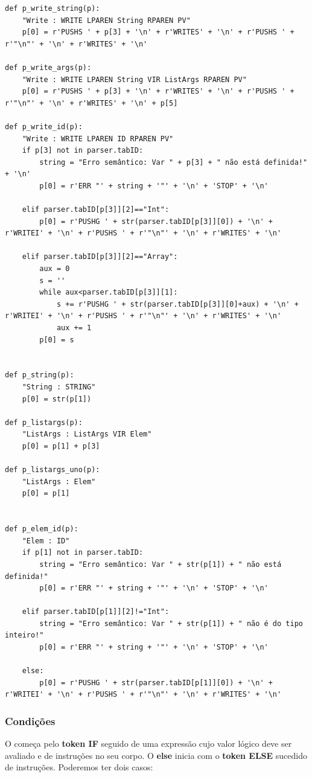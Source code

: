 \documentclass{article}
\begin{document}
\begin{lstlisting}[firstnumber=330]
def p_write_string(p):
    "Write : WRITE LPAREN String RPAREN PV"   
    p[0] = r'PUSHS ' + p[3] + '\n' + r'WRITES' + '\n' + r'PUSHS ' + r'"\n"' + '\n' + r'WRITES' + '\n'

def p_write_args(p):
    "Write : WRITE LPAREN String VIR ListArgs RPAREN PV"
    p[0] = r'PUSHS ' + p[3] + '\n' + r'WRITES' + '\n' + r'PUSHS ' + r'"\n"' + '\n' + r'WRITES' + '\n' + p[5]

def p_write_id(p):
    "Write : WRITE LPAREN ID RPAREN PV"
    if p[3] not in parser.tabID:
        string = "Erro semântico: Var " + p[3] + " não está definida!" + '\n'
        p[0] = r'ERR "' + string + '"' + '\n' + 'STOP' + '\n'

    elif parser.tabID[p[3]][2]=="Int":
        p[0] = r'PUSHG ' + str(parser.tabID[p[3]][0]) + '\n' + r'WRITEI' + '\n' + r'PUSHS ' + r'"\n"' + '\n' + r'WRITES' + '\n'

    elif parser.tabID[p[3]][2]=="Array":
        aux = 0
        s = ''
        while aux<parser.tabID[p[3]][1]:
            s += r'PUSHG ' + str(parser.tabID[p[3]][0]+aux) + '\n' + r'WRITEI' + '\n' + r'PUSHS ' + r'"\n"' + '\n' + r'WRITES' + '\n'
            aux += 1
        p[0] = s


def p_string(p):
    "String : STRING"
    p[0] = str(p[1])

def p_listargs(p):
    "ListArgs : ListArgs VIR Elem"
    p[0] = p[1] + p[3]

def p_listargs_uno(p):
    "ListArgs : Elem"
    p[0] = p[1]


def p_elem_id(p):
    "Elem : ID"
    if p[1] not in parser.tabID:
        string = "Erro semântico: Var " + str(p[1]) + " não está definida!"
        p[0] = r'ERR "' + string + '"' + '\n' + 'STOP' + '\n'

    elif parser.tabID[p[1]][2]!="Int":
        string = "Erro semântico: Var " + str(p[1]) + " não é do tipo inteiro!"
        p[0] = r'ERR "' + string + '"' + '\n' + 'STOP' + '\n'

    else:
        p[0] = r'PUSHG ' + str(parser.tabID[p[1]][0]) + '\n' + r'WRITEI' + '\n' + r'PUSHS ' + r'"\n"' + '\n' + r'WRITES' + '\n'
\end{lstlisting}


\subsubsection {Condições}
\setlength{\parindent}{5ex} O  começa pelo  \textbf{token IF} seguido de uma expressão cujo valor lógico deve ser avaliado e de instruções no seu corpo. O \textbf{else} inicia com o \textbf{token ELSE} sucedido de instruções. Poderemos ter dois casos:
\end{document}
